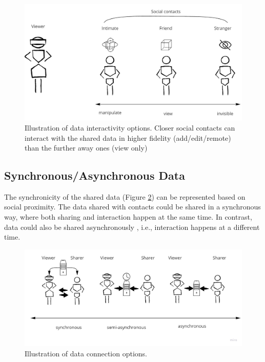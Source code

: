 \begin{figure}[h]
    \centering
    \includegraphics[width=0.8\linewidth]{images/30-continuum/Continuum-interaction.jpg}
    \caption{Illustration of data interactivity options. Closer social contacts can interact with the shared data in higher fidelity (add/edit/remote) than the further away ones (view only)}
    \label{fig:continuum:data-interaction}
\end{figure}



\subsection{Synchronous/Asynchronous Data}

The synchronicity of the shared data (Figure \ref{fig:continuum:data-connection}) can be represented based on social proximity. The data shared with contacts could be shared in a synchronous way, where both sharing and interaction happen at the same time. In contrast, data could also be shared asynchronously \cite{Smith2016}, i.e., interaction happens at a different time. 

\begin{figure}[h]
    \centering
    \includegraphics[width=0.8\linewidth]{images/30-continuum/continuum-connection.jpg}
    \caption{Illustration of data connection options.}
    \label{fig:continuum:data-connection}
\end{figure}

